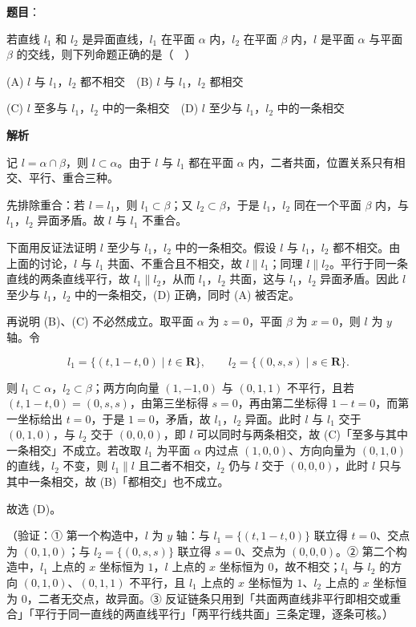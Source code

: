 \begin{answer}

\textbf{题目}：

若直线 \(l_1\) 和 \(l_2\) 是异面直线，\(l_1\) 在平面 \(\alpha\) 内，\(l_2\) 在平面 \(\beta\) 内，\(l\) 是平面 \(\alpha\) 与平面 \(\beta\) 的交线，则下列命题正确的是（　）

(A) \(l\) 与 \(l_1\)，\(l_2\) 都不相交　(B) \(l\) 与 \(l_1\)，\(l_2\) 都相交

(C) \(l\) 至多与 \(l_1\)，\(l_2\) 中的一条相交　(D) \(l\) 至少与 \(l_1\)，\(l_2\) 中的一条相交

\textbf{解析}

记 \(l=\alpha\cap\beta\)，则 \(l\subset\alpha\)。由于 \(l\) 与 \(l_1\) 都在平面 \(\alpha\) 内，二者共面，位置关系只有相交、平行、重合三种。

先排除重合：若 \(l=l_1\)，则 \(l_1\subset\beta\)；又 \(l_2\subset\beta\)，于是 \(l_1\)，\(l_2\) 同在一个平面 \(\beta\) 内，与 \(l_1\)，\(l_2\) 异面矛盾。故 \(l\) 与 \(l_1\) 不重合。

下面用反证法证明 \(l\) 至少与 \(l_1\)，\(l_2\) 中的一条相交。假设 \(l\) 与 \(l_1\)，\(l_2\) 都不相交。由上面的讨论，\(l\) 与 \(l_1\) 共面、不重合且不相交，故 \(l\parallel l_1\)；同理 \(l\parallel l_2\)。平行于同一条直线的两条直线平行，故 \(l_1\parallel l_2\)，从而 \(l_1\)，\(l_2\) 共面，这与 \(l_1\)，\(l_2\) 异面矛盾。因此 \(l\) 至少与 \(l_1\)，\(l_2\) 中的一条相交，(D) 正确，同时 (A) 被否定。

再说明 (B)、(C) 不必然成立。取平面 \(\alpha\) 为 \(z=0\)，平面 \(\beta\) 为 \(x=0\)，则 \(l\) 为 \(y\) 轴。令

\nopagebreak[4]
\[
l_1=\{(t,1-t,0)\mid t\in\mathbf{R}\},\qquad l_2=\{(0,s,s)\mid s\in\mathbf{R}\}.
\]

则 \(l_1\subset\alpha\)，\(l_2\subset\beta\)；两方向向量 \((1,-1,0)\) 与 \((0,1,1)\) 不平行，且若 \((t,1-t,0)=(0,s,s)\)，由第三坐标得 \(s=0\)，再由第二坐标得 \(1-t=0\)，而第一坐标给出 \(t=0\)，于是 \(1=0\)，矛盾，故 \(l_1\)，\(l_2\) 异面。此时 \(l\) 与 \(l_1\) 交于 \((0,1,0)\)，与 \(l_2\) 交于 \((0,0,0)\)，即 \(l\) 可以同时与两条相交，故 (C)「至多与其中一条相交」不成立。若改取 \(l_1\) 为平面 \(\alpha\) 内过点 \((1,0,0)\)、方向向量为 \((0,1,0)\) 的直线，\(l_2\) 不变，则 \(l_1\parallel l\) 且二者不相交，\(l_2\) 仍与 \(l\) 交于 \((0,0,0)\)，此时 \(l\) 只与其中一条相交，故 (B)「都相交」也不成立。

故选 (D)。

（验证：① 第一个构造中，\(l\) 为 \(y\) 轴：与 \(l_1=\{(t,1-t,0)\}\) 联立得 \(t=0\)、交点为 \((0,1,0)\)；与 \(l_2=\{(0,s,s)\}\) 联立得 \(s=0\)、交点为 \((0,0,0)\)。② 第二个构造中，\(l_1\) 上点的 \(x\) 坐标恒为 \(1\)，\(l\) 上点的 \(x\) 坐标恒为 \(0\)，故不相交；\(l_1\) 与 \(l_2\) 的方向 \((0,1,0)\)、\((0,1,1)\) 不平行，且 \(l_1\) 上点的 \(x\) 坐标恒为 \(1\)、\(l_2\) 上点的 \(x\) 坐标恒为 \(0\)，二者无交点，故异面。③ 反证链条只用到「共面两直线非平行即相交或重合」「平行于同一直线的两直线平行」「两平行线共面」三条定理，逐条可核。）


\end{answer}

